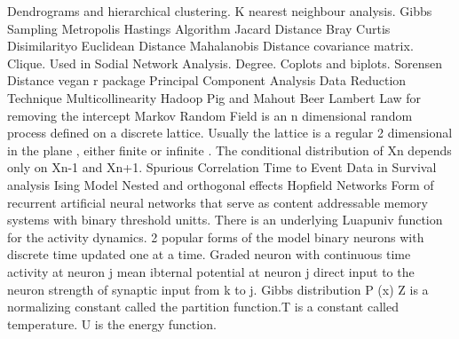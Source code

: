 Dendrograms and hierarchical clustering.
K nearest neighbour analysis.
Gibbs Sampling
Metropolis Hastings Algorithm
Jacard Distance
Bray Curtis Disimilarityo
Euclidean Distance
Mahalanobis Distance covariance matrix.
Clique. Used in Sodial Network Analysis. Degree.
Coplots and biplots.
Sorensen Distance
vegan r package
Principal Component Analysis
Data Reduction Technique
Multicollinearity
Hadoop Pig and Mahout
Beer Lambert Law for removing the intercept
Markov Random Field is an n dimensional random process defined on a discrete lattice. Usually the lattice is a regular 2 dimensional in the plane , either finite or infinite . The conditional distribution of Xn depends  only on Xn-1 and Xn+1.
Spurious Correlation
Time to Event Data in Survival analysis  
Ising Model
Nested and orthogonal effects
Hopfield Networks
Form of recurrent artificial neural networks that serve as content addressable memory systems with binary threshold unitts. There is an underlying Luapuniv function for the activity dynamics.
 2 popular forms of the model
 binary neurons with discrete time updated one at a time.
Graded neuron with continuous time
activity at neuron j
mean ibternal potential at neuron j
direct input to the neuron 
strength of synaptic input from k to j.
Gibbs distribution
 P (x)  
Z is a normalizing constant called the partition function.T is a constant called temperature. U is the energy function.

